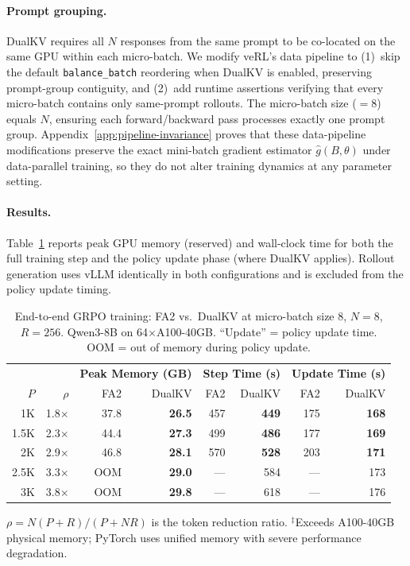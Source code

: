 \documentclass{article}
\begin{document}
\paragraph{Prompt grouping.} DualKV requires all $N$ responses from the same prompt to be co-located on the same GPU within each micro-batch. We modify veRL's data pipeline to (1)~skip the default \texttt{balance\_batch} reordering when DualKV is enabled, preserving prompt-group contiguity, and (2)~add runtime assertions verifying that every micro-batch contains only same-prompt rollouts. The micro-batch size ($=8$) equals $N$, ensuring each forward/backward pass processes exactly one prompt group. Appendix~\ref{app:pipeline-invariance} proves that these data-pipeline modifications preserve the exact mini-batch gradient estimator $\hat g(B, \theta)$ under data-parallel training, so they do not alter training dynamics at any parameter setting.

\paragraph{Results.} Table~\ref{tab:e2e-gsm8k} reports peak GPU memory (reserved) and wall-clock time for both the full training step and the policy update phase (where DualKV applies). Rollout generation uses vLLM identically in both configurations and is excluded from the policy update timing.

\begin{table}[ht]
\centering
\small
\caption{End-to-end GRPO training: FA2 vs.\ DualKV at micro-batch size 8, $N{=}8$, $R{=}256$. Qwen3-8B on 64$\times$A100-40GB. ``Update'' = policy update time. OOM = out of memory during policy update.}
\label{tab:e2e-gsm8k}
\begin{tabular}{@{}r|r|rr|rr|rr@{}}
\toprule
& & \multicolumn{2}{c|}{\textbf{Peak Memory (GB)}} & \multicolumn{2}{c|}{\textbf{Step Time (s)}} & \multicolumn{2}{c}{\textbf{Update Time (s)}} \\
$P$ & $\rho$ & FA2 & DualKV & FA2 & DualKV & FA2 & DualKV \\
\midrule
1K   & 1.8$\times$ & 37.8 & \textbf{26.5} & 457 & \textbf{449} & 175 & \textbf{168} \\
1.5K & 2.3$\times$ & 44.4 & \textbf{27.3} & 499 & \textbf{486} & 177 & \textbf{169} \\
2K   & 2.9$\times$ & 46.8\rlap{$^\ddagger$} & \textbf{28.1} & 570 & \textbf{528} & 203 & \textbf{171} \\
2.5K & 3.3$\times$ & OOM  & \textbf{29.0} & --- & 584 & --- & 173 \\
3K   & 3.8$\times$ & OOM  & \textbf{29.8} & --- & 618 & --- & 176 \\
\bottomrule
\end{tabular}
\vspace{2pt}

{\footnotesize $\rho = N(P{+}R)/(P{+}NR)$ is the token reduction ratio. $^\ddagger$Exceeds A100-40GB physical memory; PyTorch uses unified memory with severe performance degradation.}
\end{table}
\end{document}
